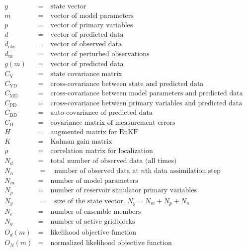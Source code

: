 \documentclass[10pt,twoside]{article}
\begin{document}
\begin{align*}
y & =  \quad \text{state vector} \\
m & =  \quad \text{vector of model parameters} \\
p & =  \quad \text{vector of primary variables} \\
d & =  \quad \text{vector of predicted data} \\
d_\text{obs} & =  \quad \text{vector of observed data} \\
d_{\text{uc}} & =  \quad \text{vector of perturbed observations} \\
g(m) & =  \quad \text{vector of predicted data} \\
C_\text{Y}  & =  \quad \text{state covariance matrix} \\
C_\text{YD} & =  \quad \text{cross-covariance between state and predicted data} \\
C_\text{MD} & =  \quad \text{cross-covariance between model parameters and predicted data} \\
C_\text{PD} & =  \quad \text{cross-covariance between primary variables and predicted data} \\
C_\text{DD} & =  \quad \text{auto-covariance of predicted data} \\
C_\text{D}  & =  \quad \text{covariance matrix of measurement errors} \\
H & =  \quad \text{augmented matrix for EnKF} \\
K & =  \quad \text{Kalman gain matrix} \\
\rho & =  \quad \text{correlation matrix for localization} \\
N_d & =  \quad \text{total number of observed data (all times)} \\
N_n & =  \quad \text{number of observed data at $n$th data assimilation step}\\
N_m & =  \quad \text{number of model parameters} \\
N_p & =  \quad \text{number of reservoir simulator primary variables} \\
N_y & =  \quad \text{size of the state vector. $N_y = N_m + N_p + N_n$} \\
N_e & =  \quad \text{number of ensemble members} \\
N_g & =  \quad \text{number of active gridblocks} \\
O_d(m) & = \quad \text{likelihood objective function}\\
O_N(m) & = \quad \text{normalized likelihood objective function}
\end{align*}
\end{document}
